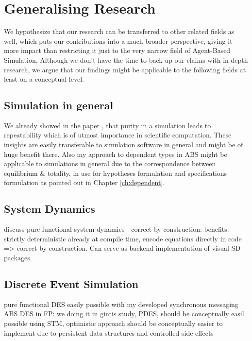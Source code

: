 \section{Generalising Research}
We hypothesize that our research can be transferred to other related fields as well, which puts our contributions into a much broader perspective, giving it more impact than restricting it just to the very narrow field of Agent-Based Simulation. Although we don't have the time to back up our claims with in-depth research, we argue that our findings might be applicable to the following fields at least on a conceptual level.

\subsection{Simulation in general}
We already showed in the paper \cite{thaler_pure_2019}, that purity in a simulation leads to repeatability which is of utmost importance in scientific computation. These insights are easily transferable to simulation software in general and might be of huge benefit there. Also my approach to dependent types in ABS might be applicable to simulations in general due to the correspondence between equilibrium \& totality, in use for hypotheses formulation and specifications formulation as pointed out in Chapter \ref{ch:dependent}. 

\subsection{System Dynamics}
\label{sub:generalising_system_dynamics}
discuss pure functional system dynamics - correct by construction: benefits: strictly deterministic already at compile time, encode equations directly in code => correct by construction. Can serve as backend implementation of visual SD packages.

\subsection{Discrete Event Simulation}
pure functional DES easily possible with my developed synchronous messaging ABS
DES in FP: we doing it in gintis study, 
PDES, should be  conceptually easil possible using STM, optimistic approach should be conceptually easier to implement due to persistent data-structures and controlled side-effects
 
